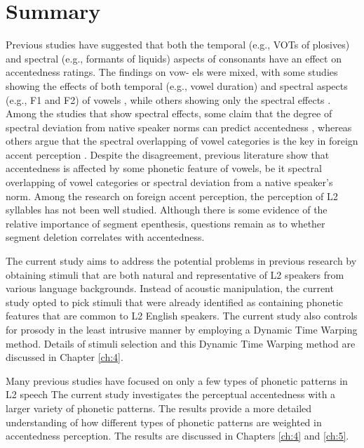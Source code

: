 \section{Summary}

Previous studies have suggested that both the temporal (e.g., VOTs of plosives) and spectral (e.g., formants of liquids) aspects of consonants have an effect on accentedness ratings. The findings on vow- els were mixed, with some studies showing the effects of both temporal (e.g., vowel duration) and spectral aspects (e.g., F1 and F2) of vowels \citep{McCullough_2013}, while others showing only the spectral effects \citep{Chan_2016}. Among the studies that show spectral effects, some claim that the degree of spectral deviation from native speaker norms can predict accentedness \citep{McCullough_2013, Wayland_1997}, whereas others argue that the spectral overlapping of vowel categories is the key in foreign accent perception \citep{Chan_2016, Sidaras_2009}. Despite the disagreement, previous literature show that accentedness is affected by some phonetic feature of vowels, be it spectral overlapping of vowel categories or spectral deviation from a native speaker’s norm. Among the research on foreign accent perception, the perception of L2 syllables has not been well studied. Although there is some evidence of the relative importance of segment epenthesis, questions remain as to whether segment deletion correlates with accentedness.

The current study aims to address the potential problems in previous research by obtaining stimuli that are both natural and representative of L2 speakers from various language backgrounds. Instead of acoustic manipulation, the current study opted to pick stimuli that were already identified as containing phonetic features that are common to L2 English speakers. The current study also controls for prosody in the least intrusive manner by employing a Dynamic Time Warping method. Details of stimuli selection and this Dynamic Time Warping method are discussed in Chapter \ref{ch:4}.


Many previous studies have focused on only a few types of phonetic patterns in L2 speech The current study investigates the perceptual accentedness with a larger variety of phonetic patterns. The results provide a more detailed understanding of how different types of phonetic patterns are weighted in accentedness perception. The results are discussed in Chapters \ref{ch:4} and \ref{ch:5}.

